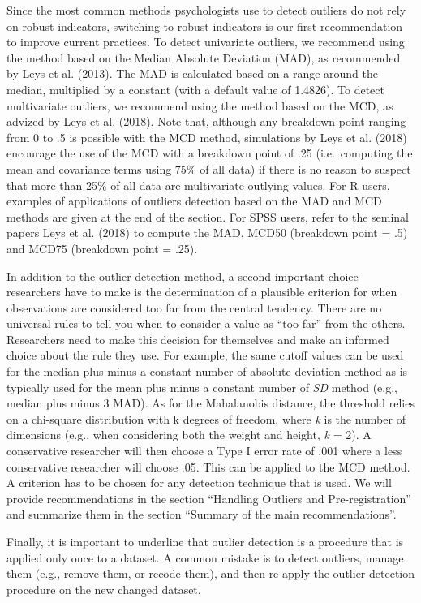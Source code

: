 \documentclass[man,floatsintext]{apa6}
\begin{document}
Since the most common methods psychologists use to detect outliers do not rely on robust indicators, switching to robust indicators is our first recommendation to improve current practices. To detect univariate outliers, we recommend using the method based on the Median Absolute Deviation (MAD), as recommended by Leys et al. (2013). The MAD is calculated based on a range around the median, multiplied by a constant (with a default value of 1.4826). To detect multivariate outliers, we recommend using the method based on the MCD, as advized by Leys et al. (2018). Note that, although any breakdown point ranging from 0 to .5 is possible with the MCD method, simulations by Leys et al. (2018) encourage the use of the MCD with a breakdown point of .25 (i.e.~computing the mean and covariance terms using 75\% of all data) if there is no reason to suspect that more than 25\% of all data are multivariate outlying values. For R users, examples of applications of outliers detection based on the MAD and MCD methods are given at the end of the section. For SPSS users, refer to the seminal papers Leys et al. (2018) to compute the MAD, MCD50 (breakdown point = .5) and MCD75 (breakdown point = .25).

In addition to the outlier detection method, a second important choice researchers have to make is the determination of a plausible criterion for when observations are considered too far from the central tendency. There are no universal rules to tell you when to consider a value as \enquote{too far} from the others. Researchers need to make this decision for themselves and make an informed choice about the rule they use. For example, the same cutoff values can be used for the median plus minus a constant number of absolute deviation method as is typically used for the mean plus minus a constant number of \emph{SD} method (e.g., median plus minus 3 MAD). As for the Mahalanobis distance, the threshold relies on a chi-square distribution with k degrees of freedom, where \emph{k} is the number of dimensions (e.g., when considering both the weight and height, \emph{k }= 2). A conservative researcher will then choose a Type I error rate of .001 where a less conservative researcher will choose .05. This can be applied to the MCD method. A criterion has to be chosen for any detection technique that is used. We will provide recommendations in the section \enquote{Handling Outliers and Pre-registration} and summarize them in the section \enquote{Summary of the main recommendations}.

Finally, it is important to underline that outlier detection is a procedure that is applied only once to a dataset. A common mistake is to detect outliers, manage them (e.g., remove them, or recode them), and then re-apply the outlier detection procedure on the new changed dataset.
\end{document}
